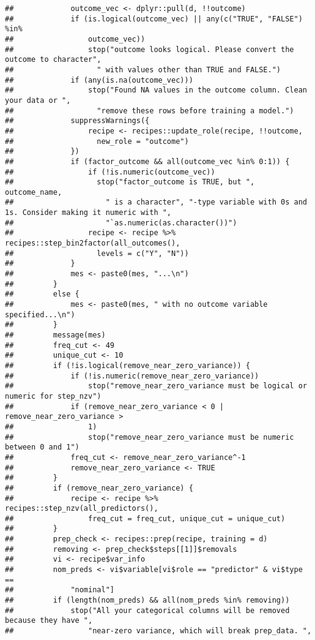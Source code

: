 \documentclass[
]{article}
\begin{document}
\begin{verbatim}
##             outcome_vec <- dplyr::pull(d, !!outcome)
##             if (is.logical(outcome_vec) || any(c("TRUE", "FALSE") %in% 
##                 outcome_vec)) 
##                 stop("outcome looks logical. Please convert the outcome to character", 
##                   " with values other than TRUE and FALSE.")
##             if (any(is.na(outcome_vec))) 
##                 stop("Found NA values in the outcome column. Clean your data or ", 
##                   "remove these rows before training a model.")
##             suppressWarnings({
##                 recipe <- recipes::update_role(recipe, !!outcome, 
##                   new_role = "outcome")
##             })
##             if (factor_outcome && all(outcome_vec %in% 0:1)) {
##                 if (!is.numeric(outcome_vec)) 
##                   stop("factor_outcome is TRUE, but ", outcome_name, 
##                     " is a character", "-type variable with 0s and 1s. Consider making it numeric with ", 
##                     "`as.numeric(as.character())")
##                 recipe <- recipe %>% recipes::step_bin2factor(all_outcomes(), 
##                   levels = c("Y", "N"))
##             }
##             mes <- paste0(mes, "...\n")
##         }
##         else {
##             mes <- paste0(mes, " with no outcome variable specified...\n")
##         }
##         message(mes)
##         freq_cut <- 49
##         unique_cut <- 10
##         if (!is.logical(remove_near_zero_variance)) {
##             if (!is.numeric(remove_near_zero_variance)) 
##                 stop("remove_near_zero_variance must be logical or numeric for step_nzv")
##             if (remove_near_zero_variance < 0 | remove_near_zero_variance > 
##                 1) 
##                 stop("remove_near_zero_variance must be numeric between 0 and 1")
##             freq_cut <- remove_near_zero_variance^-1
##             remove_near_zero_variance <- TRUE
##         }
##         if (remove_near_zero_variance) {
##             recipe <- recipe %>% recipes::step_nzv(all_predictors(), 
##                 freq_cut = freq_cut, unique_cut = unique_cut)
##         }
##         prep_check <- recipes::prep(recipe, training = d)
##         removing <- prep_check$steps[[1]]$removals
##         vi <- recipe$var_info
##         nom_preds <- vi$variable[vi$role == "predictor" & vi$type == 
##             "nominal"]
##         if (length(nom_preds) && all(nom_preds %in% removing)) 
##             stop("All your categorical columns will be removed because they have ", 
##                 "near-zero variance, which will break prep_data. ", 

\end{verbatim}
\end{document}
